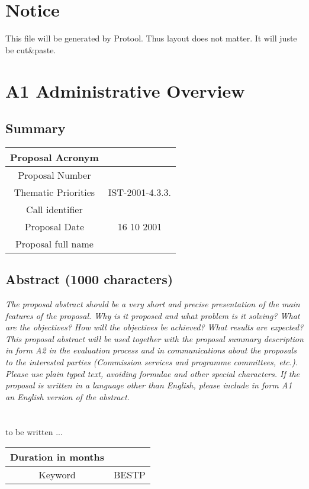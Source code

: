 \documentclass[a4paper,11pt]{report}
\begin{document}
\section*{Notice}
This file will be generated by Protool. Thus layout does not matter. It will
juste be cut\&paste.
\section*{A1 Administrative Overview}
\subsection*{Summary}
\begin{tabular}{|c|c|}
\hline
Proposal Acronym &  \\ \hline
Proposal Number &  \\ \hline
Thematic Priorities & IST-2001-4.3.3. \\ \hline
Call identifier & \\ \hline
Proposal Date & 16 10 2001 \\ \hline
Proposal full name & \\ \hline
\end{tabular}
\subsection*{Abstract (1000 characters)}
\textit{The proposal abstract should be a very short and precise presentation
of the main features of the proposal. Why is it proposed and what problem is it
solving? What are the objectives? How will the objectives be achieved? What
results are expected? This proposal abstract will be used together with the
proposal summary description in form A2 in the evaluation process and in
communications about the proposals to the interested parties (Commission
services and programme committees, etc.). Please use plain typed text, avoiding
formulae and other special characters. If the proposal is written in a language
other than English, please include in form A1 an English version of the
abstract.} \\
\\ \\
to be written ...
\begin{tabular}{|c|c|}
\hline
Duration in months & \\ \hline
Keyword & BESTP \\ \hline
\end{tabular}
\end{document}
